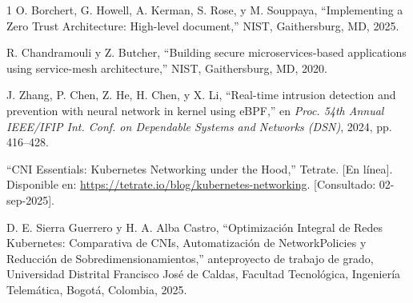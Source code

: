 \begin{thebibliography}{1}
O. Borchert, G. Howell, A. Kerman, S. Rose, y M. Souppaya, ``Implementing a Zero Trust Architecture: High-level document,'' NIST, Gaithersburg, MD, 2025.

R. Chandramouli y Z. Butcher, ``Building secure microservices-based applications using service-mesh architecture,'' NIST, Gaithersburg, MD, 2020.

J. Zhang, P. Chen, Z. He, H. Chen, y X. Li, ``Real-time intrusion detection and prevention with neural network in kernel using eBPF,'' en \emph{Proc. 54th Annual IEEE/IFIP Int. Conf. on Dependable Systems and Networks (DSN)}, 2024, pp. 416--428.

``CNI Essentials: Kubernetes Networking under the Hood,'' Tetrate. [En línea]. Disponible en: \url{https://tetrate.io/blog/kubernetes-networking}. [Consultado: 02-sep-2025].

D. E. Sierra Guerrero y H. A. Alba Castro, ``Optimización Integral de Redes Kubernetes: Comparativa de CNIs, Automatización de NetworkPolicies y Reducción de Sobredimensionamientos,'' anteproyecto de trabajo de grado, Universidad Distrital Francisco José de Caldas, Facultad Tecnológica, Ingeniería Telemática, Bogotá, Colombia, 2025.

\end{thebibliography}
